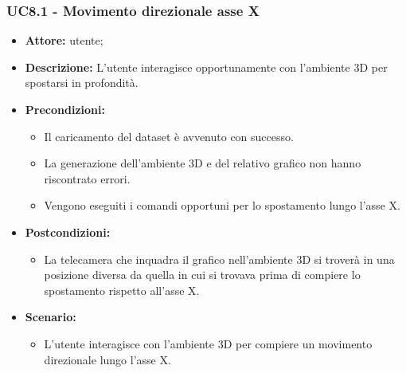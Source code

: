 \subsubsection{UC8.1 - Movimento direzionale asse X}
\begin{itemize}    
    \item \textbf{Attore:} utente;
    \item \textbf{Descrizione:} L'utente interagisce opportunamente con l'ambiente 3D per spostarsi in profondità.
    \item \textbf{Precondizioni:}    
        \begin{itemize}
            \item Il caricamento del dataset è avvenuto con successo.
            \item La generazione dell'ambiente 3D e del relativo grafico non hanno riscontrato errori.
            \item Vengono eseguiti i comandi opportuni per lo spostamento lungo l'asse X.
        \end{itemize}    
    \item \textbf{Postcondizioni:}
        \begin{itemize}
            \item La telecamera che inquadra il grafico nell'ambiente 3D si troverà in una posizione diversa da quella in cui si trovava prima di compiere lo spostamento rispetto all'asse X.
        \end{itemize}    
    \item \textbf{Scenario:} 
        \begin{itemize}
            \item L'utente interagisce con l'ambiente 3D per compiere un movimento direzionale lungo l'asse X.
        \end{itemize}
\end{itemize}
